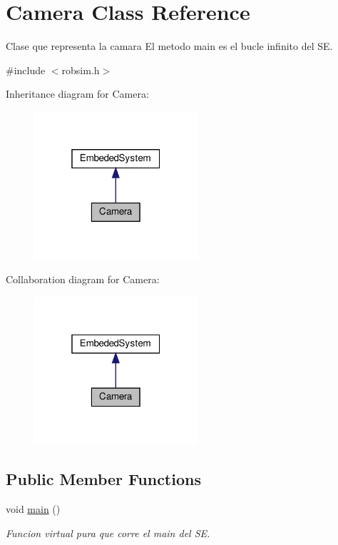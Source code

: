 \hypertarget{classCamera}{}\section{Camera Class Reference}
\label{classCamera}


Clase que representa la camara El metodo main es el bucle infinito del SE.  




{\ttfamily \#include $<$robsim.\+h$>$}



Inheritance diagram for Camera\+:
\nopagebreak
\begin{figure}[H]
\begin{center}
\leavevmode
\includegraphics[width=172pt]{classCamera__inherit__graph}
\end{center}
\end{figure}


Collaboration diagram for Camera\+:
\nopagebreak
\begin{figure}[H]
\begin{center}
\leavevmode
\includegraphics[width=172pt]{classCamera__coll__graph}
\end{center}
\end{figure}
\subsection*{Public Member Functions}
\begin{DoxyCompactItemize}
\item 
void \hyperlink{classCamera_a1719371e1e57ad18abfa5dd3d971bb39}{main} ()
\begin{DoxyCompactList}\small\item\em Funcion virtual pura que corre el main del SE. \end{DoxyCompactList}\end{DoxyCompactItemize}


